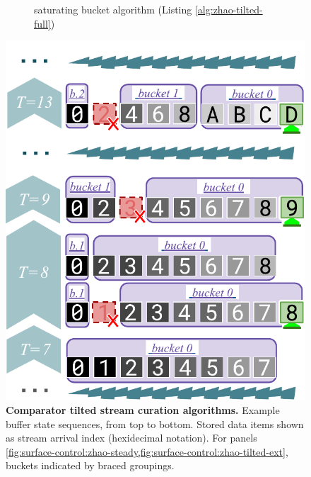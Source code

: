 \begin{figure}
\begin{subfigure}{0.33\linewidth}
\centering
\caption{saturating bucket algorithm (Listing \ref{alg:zhao-tilted-full})}
\label{fig:surface-control-tilted:saturating-bucket}
\end{subfigure}
\begin{minipage}{0.63\linewidth}
\includegraphics[width=\linewidth]{img/surface-control-tilted-saturating-bucket}
\end{minipage}

\caption{%
\textbf{Comparator tilted stream curation algorithms.}
\footnotesize
Example buffer state sequences, from top to bottom.
Stored data items shown as stream arrival index (hexidecimal notation).
For panels \cref{fig:surface-control:zhao-steady,fig:surface-control:zhao-tilted-ext}, buckets indicated by braced groupings.
}
\label{fig:surface-control-tilted}

\end{figure}
